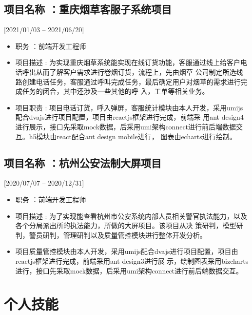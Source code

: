 \documentclass{mycv}
\begin{document}
\subsection{项目名称 ：重庆烟草客服子系统项目}[2021/01/03 – 2021/06/20]

\begin{itemize}
  \item 职务 ：前端开发工程师
  \item 项目描述 : 为实现重庆烟草系统能实现在线订货功能，客服通过线上给客户电话呼出从而了解客户需求进行卷烟订货，流程上，先由烟草
        公司制定所选线路创建电话任务，客服通过呼叫完成任务，最后确定用户对烟草的需求进行完成任务的闭合，其中还涉及一些其他的呼
        入，工单等相关业务。
  \item 项目职责 : 项目电话订货，呼入弹屏，客服统计模块由本人开发，采用umijs配合dvajs进行项目配置，项目由reactjs框架进行完成，前端采
        用ant design4进行展示，接口先采取mock数据，后采用umi架构connect进行前后端数据交互。h5模块由react配合ant design mobile进行，
        图表由echarts进行绘制。
\end{itemize}

\subsection{项目名称 ：杭州公安法制大屏项目}[2020/07/07 – 2020/12/31]

\begin{itemize}
  \item 职务 ：前端开发工程师
  \item 项目描述 : 为了实现能查看杭州市公安系统内部人员相关警官执法能力，以及各个分局派出所的执法能力，所做的大屏项目。该项目从决
        策研判，模型研判，警员研判，管理研判以及质量管控模块进行整体开发分析。
  \item 项目质量管控模块由本人开发，采用umijs配合dvajs进行项目配置，项目由reactjs框架进行完成，前端采用ant design3进行展
        示，绘制图表采用bizcharts进行，接口先采取mock数据，后采用umi架构connect进行前后端数据交互。
\end{itemize}

\section{个人技能}
\end{document}
